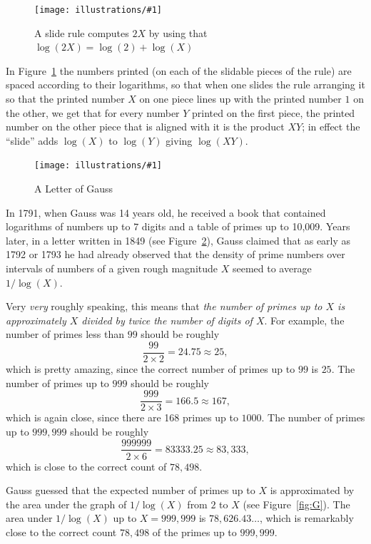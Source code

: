 \documentclass[openany]{book}
\newcommand{\ill}[3]{%
   \begin{figure}[H]%
   \vspace{-2ex}
   \centering%
   \texttt{[image: illustrations/\#1]}%
   \caption{#3}%
   \vspace{-2ex}
    \end{figure}}
\theoremstyle{plain}
\theoremstyle{definition}
\begin{document}
\ill{slide_rule}{.8}{A slide rule  computes $2X$ by using that $\log(2X)=\log(2)+\log(X)$\label{fig:slide_rule}}

In Figure~\ref{fig:slide_rule} the numbers printed (on each of the slidable pieces of the rule)
are spaced according to their logarithms, so that when one slides the
rule arranging it so that the printed  number $X$ on one piece lines up
with the printed number $1$ on the other, we get that for every number $Y$
printed on the first piece, the printed number on the other piece that
is  aligned with it is the product $XY$; in effect the ``slide'' adds 
$\log(X)$ to $\log(Y)$ giving $\log(XY)$.

\ill{gauss_tables_half}{.9}{A Letter of Gauss\label{fig:gauss_letter}}

In 1791, when Gauss was 14 years old, he received a book that contained 
logarithms of numbers up to $7$ digits and a table of primes up to 10,009.
Years later, in a letter
written in 1849 (see Figure~\ref{fig:gauss_letter}), Gauss
claimed that as early as 1792 or 1793 he had already observed that the
density of prime numbers over intervals of numbers of a given rough
magnitude $X$ seemed to average $1/\log(X)$.

 Very {\em very} roughly speaking, this
means that {\em the number of primes up to $X$ is approximately $X$ divided by
twice the number of digits of $X$}.  For example,
the number of primes less than $99$ should be roughly
$$
   \frac{99}{2\times 2} = 24.75 \approx  25,
$$   
which is pretty amazing, since the correct number of
primes up to $99$ is $25$.  The number of primes up to $999$ should
be roughly
$$
   \frac{999}{2\times 3} = 166.5 \approx  167,
$$   
which is again close, since there are 168 primes up to $1000$. 
The number of primes up to $999,\!999$ should be roughly
$$
   \frac{999999}{2\times 6} = 83333.25 \approx  83,\!333,
$$   
which is close to the correct count of $78,\!498$. 

Gauss guessed that the expected number of primes up to $X$ 
is approximated by the area under the
graph of $1/\log(X)$ from $2$ to $X$ (see Figure~\ref{fig:G}).
The area under $1/\log(X)$ up to $X=999,\!999$ is $78,\!626.43\ldots$, which
is remarkably close to the correct count $78,\!498$ of the primes
up to $999,\!999$.
\end{document}
